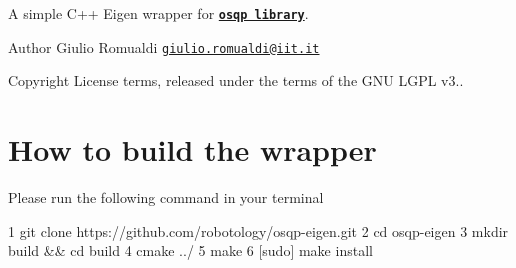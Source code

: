 A simple C++ Eigen wrapper for \href{http://osqp.readthedocs.io/en/latest/}{\tt {\bfseries osqp library}}. \begin{DoxyAuthor}{Author}
Giulio Romualdi \href{mailto:giulio.romualdi@iit.it}{\tt giulio.\+romualdi@iit.\+it} ~\newline
 
\end{DoxyAuthor}
\begin{DoxyCopyright}{Copyright}
License terms, released under the terms of the G\+NU L\+G\+PL v3..
\end{DoxyCopyright}
\hypertarget{index_build-section}{}\section{How to build the wrapper}\label{index_build-section}
Please run the following command in your terminal 
\begin{DoxyCode}
1 git clone https://github.com/robotology/osqp-eigen.git
2 cd osqp-eigen
3 mkdir build && cd build
4 cmake ../
5 make
6 [sudo] make install
\end{DoxyCode}


